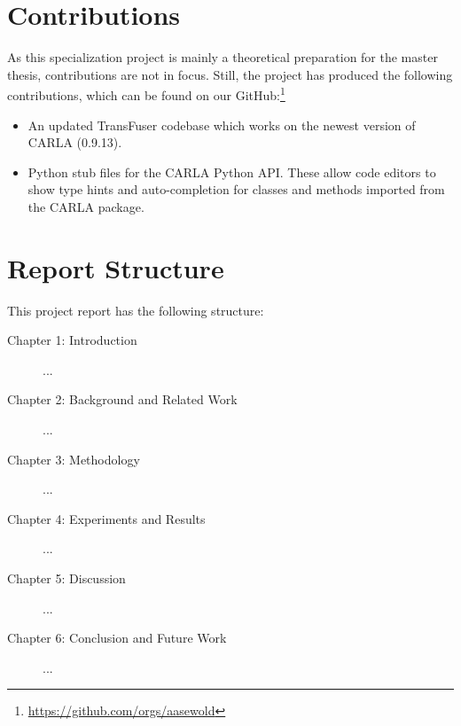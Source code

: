\section{Contributions}
As this specialization project is mainly a theoretical preparation for the master thesis, contributions are not in focus. Still, the project has produced the following contributions, which can be found on our GitHub:\footnote{\url{https://github.com/orgs/aasewold}}

\begin{itemize}
    \item An updated TransFuser codebase which works on the newest version of CARLA (0.9.13).
    \item Python stub files for the CARLA Python API. These allow code editors to show type hints and auto-completion for classes and methods imported from the CARLA package.
\end{itemize}


\section{Report Structure} %
This project report has the following structure:

\begin{description}
    \item[Chapter 1: Introduction] ...
    \item[Chapter 2: Background and Related Work] ...
    \item[Chapter 3: Methodology] ...
    \item[Chapter 4: Experiments and Results] ...
    \item[Chapter 5: Discussion] ...
    \item[Chapter 6: Conclusion and Future Work] ...
\end{description}
